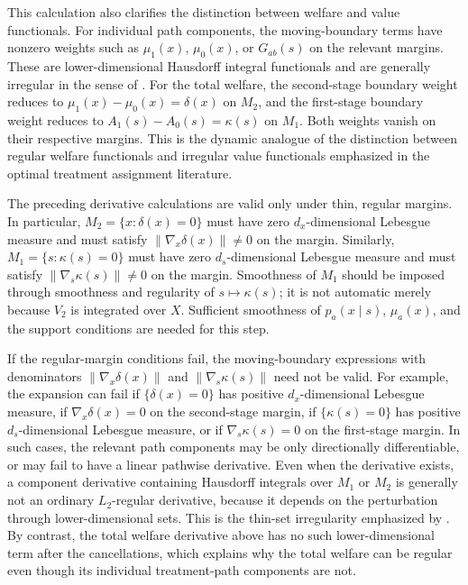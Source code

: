 \documentclass[12pt]{article}
\newcommand{\1}{\mathbf{1}}
\begin{document}
This calculation also clarifies the distinction between welfare and value
functionals. For individual path components, the moving-boundary terms have
nonzero weights such as $\mu_1(x)$, $\mu_0(x)$, or $G_{ab}(s)$ on the relevant
margins. These are lower-dimensional Hausdorff integral functionals and are
generally irregular in the sense of \cite{chenGao2026thin}. For the total
welfare, the second-stage boundary weight reduces to
$\mu_1(x)-\mu_0(x)=\delta(x)$ on $M_2$, and the first-stage boundary weight
reduces to $A_1(s)-A_0(s)=\kappa(s)$ on $M_1$. Both weights vanish on their
respective margins. This is the dynamic analogue of the distinction between
regular welfare functionals and irregular value functionals emphasized in the
optimal treatment assignment literature.

The preceding derivative calculations are valid only under thin, regular
margins. In particular, $M_2=\{x:\delta(x)=0\}$ must have zero
$d_x$-dimensional Lebesgue measure and must satisfy
$\lVert\nabla_x\delta(x)\rVert\neq 0$ on the margin. Similarly,
$M_1=\{s:\kappa(s)=0\}$ must have zero $d_s$-dimensional Lebesgue measure and
must satisfy $\lVert\nabla_s\kappa(s)\rVert\neq 0$ on the margin. Smoothness of
$M_1$ should be imposed through smoothness and regularity of
$s\mapsto\kappa(s)$; it is not automatic merely because $V_2$ is integrated
over $X$. Sufficient smoothness of $p_a(x\mid s)$, $\mu_a(x)$, and the support
conditions are needed for this step.

If the regular-margin conditions fail, the moving-boundary expressions with
denominators $\lVert\nabla_x\delta(x)\rVert$ and
$\lVert\nabla_s\kappa(s)\rVert$ need not be valid. For example, the expansion
can fail if $\{\delta(x)=0\}$ has positive $d_x$-dimensional Lebesgue measure,
if $\nabla_x\delta(x)=0$ on the second-stage margin, if
$\{\kappa(s)=0\}$ has positive $d_s$-dimensional Lebesgue measure, or if
$\nabla_s\kappa(s)=0$ on the first-stage margin. In such cases, the relevant
path components may be only directionally differentiable, or may fail to have
a linear pathwise derivative. Even when the derivative exists, a component
derivative containing Hausdorff integrals over $M_1$ or $M_2$ is generally not
an ordinary $L_2$-regular derivative, because it depends on the perturbation
through lower-dimensional sets. This is the thin-set irregularity emphasized by
\cite{chenGao2026thin}. By contrast, the total welfare derivative above has no
such lower-dimensional term after the cancellations, which explains why the
total welfare can be regular even though its individual treatment-path
components are not.
\end{document}
